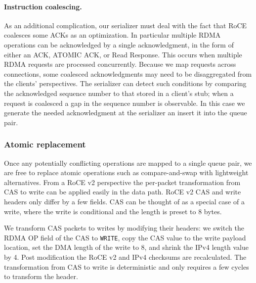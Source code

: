 \paragraph{Instruction coalescing.}

As an additional complication, our serializer must deal with the fact
that RoCE coalesces some ACKs as an optimization.  In particular
multiple RDMA operations can be acknowledged by a single
acknowledgment, in the form of either an ACK, ATOMIC ACK, or Read
Response. This occurs when multiple RDMA requests are processed
concurrently.  Because we map requests across connections, some
coalesced acknowledgments may need to be disaggregated from the
clients' perspectives.
%
The serializer can detect such conditions by comparing the
acknowledged sequence number to that stored in a client's stub; when a
request is coalesced a gap in the sequence number is observable. In
this case we generate the needed acknowledgment at the serializer an
insert it into the queue pair.



\subsubsection{Atomic replacement} 

Once any potentially conflicting operations are mapped to a single
queue pair, we are free to replace atomic operations such as
compare-and-swap with lightweight alternatives.  From a RoCE v2 perspective
the per-packet transformation from CAS to write can be applied easily
in the data path.  RoCE v2 CAS and write headers only differ by a few
fields. CAS can be thought of as a special case of a write, where the
write is conditional and the length is preset to 8 bytes.

We transform CAS packets to writes by modifying their headers: we
switch the RDMA OP field of the CAS to \texttt{WRITE}, copy the CAS
value to the write payload location, set the DMA length of the write
to 8, and shrink the IPv4 length value by 4.  Post modification the RoCE v2
and IPv4 checksums are recalculated.
The transformation from CAS to write
is deterministic and only requires a few cycles to transform the
header.

